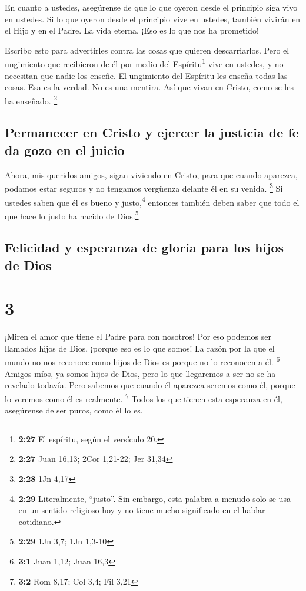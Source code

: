  En cuanto a ustedes, asegúrense de que lo que oyeron
desde el principio siga vivo en ustedes. Si lo que oyeron desde el
principio vive en ustedes, también vivirán en el Hijo y en el Padre.
 La vida eterna. ¡Eso es lo que nos ha prometido!

 Escribo esto para advertirles contra las cosas que
quieren descarriarlos.  Pero el ungimiento que recibieron
de él por medio del Espíritu\footnote{\textbf{2:27} El espíritu, según
  el versículo 20.} vive en ustedes, y no necesitan que nadie los
enseñe. El ungimiento del Espíritu les enseña todas las cosas. Esa es la
verdad. No es una mentira. Así que vivan en Cristo, como se les ha
enseñado. \footnote{\textbf{2:27} Juan 16,13; 2Cor 1,21-22; Jer 31,34}

\hypertarget{permanecer-en-cristo-y-ejercer-la-justicia-de-fe-da-gozo-en-el-juicio}{%
\subsection{Permanecer en Cristo y ejercer la justicia de fe da gozo en
el
juicio}\label{permanecer-en-cristo-y-ejercer-la-justicia-de-fe-da-gozo-en-el-juicio}}

 Ahora, mis queridos amigos, sigan viviendo en Cristo,
para que cuando aparezca, podamos estar seguros y no tengamos vergüenza
delante él en su venida. \footnote{\textbf{2:28} 1Jn 4,17}
 Si ustedes saben que él es bueno y justo,\footnote{\textbf{2:29}
  Literalmente, ``justo''. Sin embargo, esta palabra a menudo solo se
  usa en un sentido religioso hoy y no tiene mucho significado en el
  hablar cotidiano.} entonces también deben saber que todo el que hace
lo justo ha nacido de Dios.\footnote{\textbf{2:29} 1Jn 3,7; 1Jn 1,3-10}

\hypertarget{felicidad-y-esperanza-de-gloria-para-los-hijos-de-dios}{%
\subsection{Felicidad y esperanza de gloria para los hijos de
Dios}\label{felicidad-y-esperanza-de-gloria-para-los-hijos-de-dios}}

\hypertarget{section-2}{%
\section{3}\label{section-2}}

 ¡Miren el amor que tiene el Padre para con nosotros! Por
eso podemos ser llamados hijos de Dios, ¡porque eso es lo que somos! La
razón por la que el mundo no nos reconoce como hijos de Dios es porque
no lo reconocen a él. \footnote{\textbf{3:1} Juan 1,12; Juan 16,3}
 Amigos míos, ya somos hijos de Dios, pero lo que
llegaremos a ser no se ha revelado todavía. Pero sabemos que cuando él
aparezca seremos como él, porque lo veremos como él es realmente.
\footnote{\textbf{3:2} Rom 8,17; Col 3,4; Fil 3,21}  Todos
los que tienen esta esperanza en él, asegúrense de ser puros, como él lo
es.

